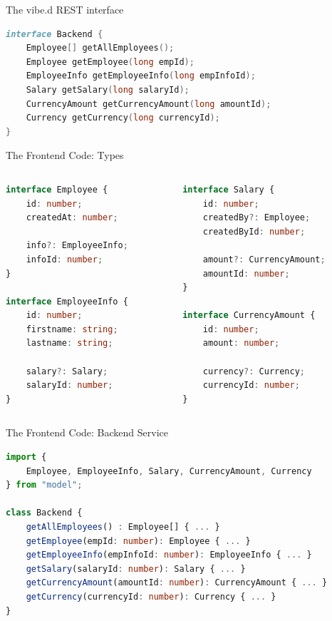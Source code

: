 \documentclass[aspectratio=169]{beamer}
\begin{document}
	\begin{frame}[fragile]{The vibe.d REST interface}
\begin{lstlisting}[language=D,basicstyle=\normalsize\ttfamily]
interface Backend {
	Employee[] getAllEmployees();
	Employee getEmployee(long empId);
	EmployeeInfo getEmployeeInfo(long empInfoId);
	Salary getSalary(long salaryId);
	CurrencyAmount getCurrencyAmount(long amountId);
	Currency getCurrency(long currencyId);
}
\end{lstlisting}
	\end{frame}

	\begin{frame}[fragile]{The Frontend Code: Types}
\begin{columns}
\begin{column}{0.5\textwidth}
\begin{lstlisting}[language=typescript,basicstyle=\small\ttfamily]
interface Employee {
	id: number;
	createdAt: number;

	info?: EmployeeInfo;
	infoId: number;
}	

interface EmployeeInfo {
	id: number;
	firstname: string;
	lastname: string;

	salary?: Salary;
	salaryId: number;
}	
\end{lstlisting}
\end{column}
\begin{column}{0.5\textwidth}
\begin{lstlisting}[language=TypeScript,basicstyle=\small\ttfamily,firstnumber=17]
interface Salary {
	id: number;
	createdBy?: Employee;
	createdById: number;

	amount?: CurrencyAmount;
	amountId: number;
}

interface CurrencyAmount {
	id: number;
	amount: number;

	currency?: Currency;
	currencyId: number;
}
\end{lstlisting}
\end{column}
\end{columns}
	\end{frame}

	\begin{frame}[fragile]{The Frontend Code: Backend Service}
\begin{lstlisting}[language=TypeScript,basicstyle=\small\ttfamily,tabsize=4]
import { 
	Employee, EmployeeInfo, Salary, CurrencyAmount, Currency 
} from "model";

class Backend {
	getAllEmployees() : Employee[] { ... }
	getEmployee(empId: number): Employee { ... }
	getEmployeeInfo(empInfoId: number): EmployeeInfo { ... }
	getSalary(salaryId: number): Salary { ... }
	getCurrencyAmount(amountId: number): CurrencyAmount { ... }
	getCurrency(currencyId: number): Currency { ... }
}
\end{lstlisting}
	\end{frame}
\end{document}
